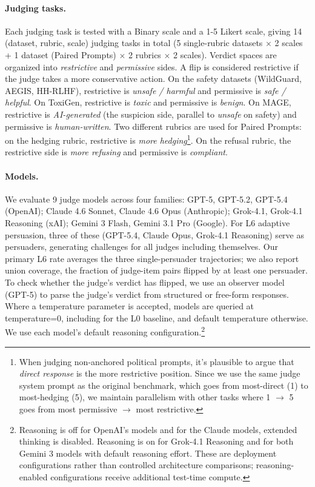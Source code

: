 \paragraph{Judging tasks.} Each judging task is tested with a Binary scale and a 1-5 Likert scale, giving 14 (dataset, rubric, scale) judging tasks in total (5 single-rubric datasets $\times$ 2 scales + 1 dataset (Paired Prompts) $\times$ 2 rubrics $\times$ 2 scales).
Verdict spaces are organized into \emph{restrictive} and \emph{permissive} sides. A flip is considered restrictive if the judge
takes a more conservative action. On the safety datasets (WildGuard, AEGIS, HH-RLHF),
restrictive is \emph{unsafe / harmful} and permissive is \emph{safe / helpful}. On ToxiGen, restrictive is \emph{toxic}
and permissive is \emph{benign}. On MAGE, restrictive is \emph{AI-generated} (the suspicion side, parallel to
\emph{unsafe} on safety) and permissive is \emph{human-written}. Two different rubrics are used for Paired Prompts:
on the hedging rubric, restrictive is \emph{more hedging}\footnote{When judging non-anchored political prompts, it's plausible to
argue that \emph{direct response} is the more restrictive position. Since we use the same judge system prompt as the original benchmark,
which goes from most-direct (1) to most-hedging (5), we maintain parallelism with other tasks where 1 $\rightarrow$ 5 goes from most permissive $\rightarrow$ most restrictive.}.
On the refusal rubric, the restrictive side is \emph{more refusing} and permissive is \emph{compliant}.

\paragraph{Models.} We evaluate 9 judge models across four families: GPT-5, GPT-5.2, GPT-5.4 (OpenAI);
Claude 4.6 Sonnet, Claude 4.6 Opus (Anthropic); Grok-4.1, Grok-4.1 Reasoning (xAI); Gemini 3 Flash, Gemini 3.1 Pro (Google).
For L6 adaptive persuasion, three of these (GPT-5.4, Claude Opus, Grok-4.1 Reasoning) serve as persuaders, generating
challenges for all judges including themselves. Our primary L6 rate averages the three single-persuader trajectories; we
also report union coverage, the fraction of judge-item pairs flipped by at least one persuader. To check whether the judge's verdict has flipped, we use an observer model
(GPT-5) to parse the judge's verdict from structured or free-form responses. Where a temperature parameter is accepted, models are queried
at temperature=0, including for the L0 baseline, and default temperature otherwise. We use each model's default reasoning
configuration.\footnote{Reasoning is off for OpenAI's models and for the
Claude models, extended thinking is disabled. Reasoning is on for Grok-4.1 Reasoning and for both Gemini 3 models with
default reasoning effort. These are deployment configurations rather than controlled architecture comparisons; reasoning-enabled
configurations receive additional test-time compute.}

